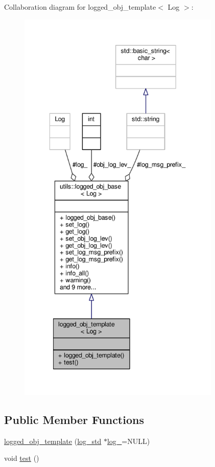 Collaboration diagram for logged\-\_\-obj\-\_\-template$<$ Log $>$\-:\nopagebreak
\begin{figure}[H]
\begin{center}
\leavevmode
\includegraphics[height=550pt]{classlogged__obj__template__coll__graph}
\end{center}
\end{figure}
\subsection*{Public Member Functions}
\begin{DoxyCompactItemize}
\item 
\hyperlink{classlogged__obj__template_ac6737589850a625d7d112531f4248d6e}{logged\-\_\-obj\-\_\-template} (\hyperlink{classutils_1_1log__std}{log\-\_\-std} $\ast$\hyperlink{classutils_1_1logged__obj__base_a8dedfdc5d7ab2e5aaed5e24797e51977}{log\-\_\-}=N\-U\-L\-L)
\item 
void \hyperlink{classlogged__obj__template_ab1b1cf9ed29eb291f0c67a4d8b9f1827}{test} ()
\end{DoxyCompactItemize}
